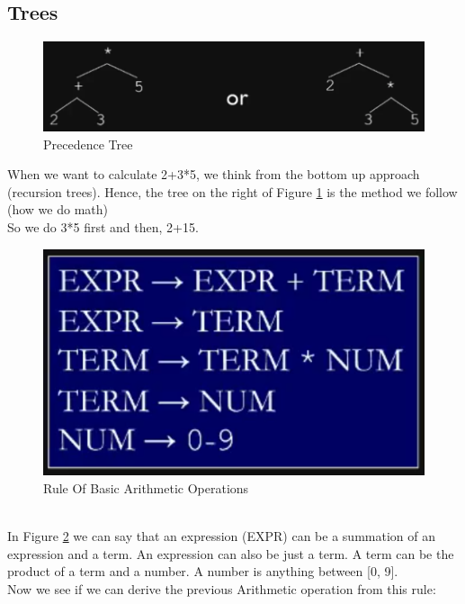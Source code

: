 \documentclass{article}
\begin{document}
    \subsection*{Trees}
    \begin{figure}[h]
            \centerline{\includegraphics[scale=0.3]{Precedence Tree.png}}
            \caption{Precedence Tree}
            \label{precedence tree}
    \end{figure}
    When we want to calculate 2+3*5, we think from the bottom up approach (recursion trees). Hence, the tree on the right of Figure \ref{precedence tree} is the method we follow (how we do math)
    \\
    So we do 3*5 first and then, 2+15.
    \begin{figure}[h]
        \centerline{
            \includegraphics[scale=0.3]
            {RuleForArithmetic.png}
        }
        \caption{Rule Of Basic Arithmetic Operations}
        \label{Arithmetic Rule}
    \end{figure}
    \\
    In Figure \ref{Arithmetic Rule} we can say that an expression (EXPR) can be a summation of an expression and a term. An expression can also be just a term. A term can be the product of a term and a number. A number is anything between [0, 9].
    \\
    Now we see if we can derive the previous Arithmetic operation from this rule:
\end{document}
